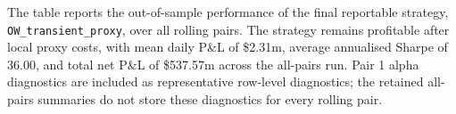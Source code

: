 The table reports the out-of-sample performance of the final reportable strategy, \texttt{OW\_transient\_proxy}, over all rolling pairs. The strategy remains profitable after local proxy costs, with mean daily P\&L of \$2.31m, average annualised Sharpe of 36.00, and total net P\&L of \$537.57m across the all-pairs run. Pair 1 alpha diagnostics are included as representative row-level diagnostics; the retained all-pairs summaries do not store these diagnostics for every rolling pair.
